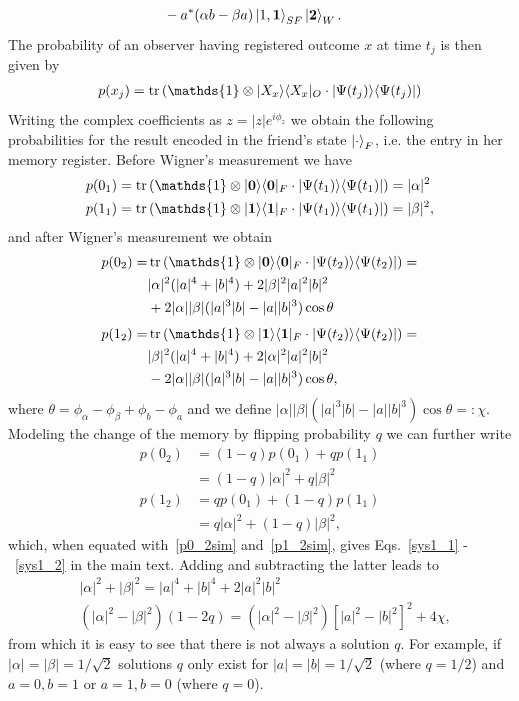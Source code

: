 \documentclass[a4paper,twocolumn,11pt,accepted=2017-05-09,dvipsnames]{quantumarticle}
\numberwithin{equation}{section}
\newcommand{\proj}[1]{|#1\rangle\langle#1|}
\begin{document}
\begin{appendix}
\begin{align}
	&-a^*(\alpha b -  \beta a)\ket{1,\bm 1}_{SF}\ket{\bm 2}_W.
\end{align}
The probability of an observer having registered outcome $x$ at time $t_j$ is then given by
\begin{align}
\label{prob}
p(x_j)= \tr \left( \mathds{1}\otimes\proj{X_x}_O \cdot \proj{\Psi(t_j)} \right)
\end{align}
Writing the complex coefficients as $z=|z|e^{i\phi_z}$ we obtain the following probabilities for the result encoded in the friend's state $\ket{\cdot}_F$, i.e. the entry in her memory register. Before Wigner's measurement we have
\begin{align}
p(0_1)&=\tr \left(\mathds{1}\otimes \proj{\bm 0}_F \cdot \proj{\Psi(t_1)} \right)= |\alpha|^2 \\
p(1_1)&=\tr \left( \mathds{1}\otimes \proj{\bm 1}_F \cdot \proj{\Psi(t_1)} \right)= |\beta|^2 ,
\end{align}
and after Wigner's measurement we obtain
\begin{align}
p(0_2)=&\tr \left(\mathds{1}\otimes \proj{\bm 0}_F \cdot \proj{\Psi(t_2)} \right)= \nonumber \\
& |\alpha|^2 (|a|^4+|b|^4)+2 |\beta|^2|a|^2|b|^2 \nonumber\\
\label{p0_2sim}
	&+2|\alpha| |\beta| (|a|^3|b| - |a||b|^3)\cos{\theta} 
\end{align}	
\begin{align}
p(1_2)=&\tr \left(\mathds{1}\otimes \proj{\bm 1}_F \cdot \proj{\Psi(t_2)} \right)= \nonumber \\
&|\beta|^2 (|a|^4+|b|^4)+2 |\alpha|^2|a|^2|b|^2 \nonumber \\
\label{p1_2sim}
	&-2|\alpha| |\beta| (|a|^3|b| - |a||b|^3)\cos{\theta},
\end{align}
where $\theta=\phi_{\alpha}-\phi_{\beta}+\phi_b -\phi_a$ and we define $|\alpha| |\beta| (|a|^3|b| - |a||b|^3)\cos{\theta}=:\chi$. Modeling the change of the memory by flipping probability $q$ we can further write
\begin{align}
\nonumber
p(0_2)&=(1-q)p(0_1) + qp(1_1)\\
&=(1-q)|\alpha|^2 + q|\beta|^2\\
\nonumber
p(1_2)&= qp(0_1) + (1-q)p(1_1)\\
&=q|\alpha|^2 + (1-q)|\beta|^2,
\end{align}
which, when equated with~\eqref{p0_2sim} and~\eqref{p1_2sim}, gives Eqs.~\eqref{sys1_1} -~\eqref{sys1_2} in the main text. Adding and subtracting the latter leads to
\begin{align*}
&|\alpha|^2+|\beta|^2=|a|^4+|b|^4 + 2|a|^2|b|^2\\
&(|\alpha|^2-|\beta|^2)(1-2q)= (|\alpha|^2-|\beta|^2)[|a|^2- |b|^2]^2+4\chi,
\end{align*}
from which it is easy to see that there is not always a solution $q$. For example, if $|\alpha|=|\beta|=1/\sqrt{2}$ solutions $q$ only exist for $|a|=|b|=1/\sqrt{2}$ (where $q=1/2$) and $a=0,b=1$ or $a=1,b=0$ (where $q=0$). \\


\end{appendix}
\end{document}
